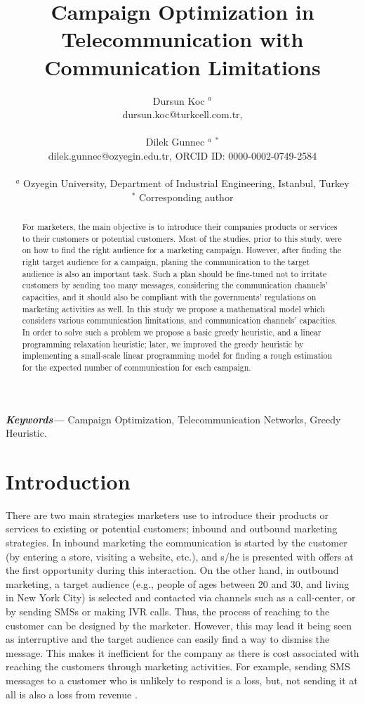 \documentclass[11pt]{article}
\title{Campaign Optimization in Telecommunication with Communication Limitations\\}
\author{Dursun Koc $^{a}$ \\ 
	dursun.koc@turkcell.com.tr, \\\\
	Dilek Gunnec $^{a}$ $^{\ast}$\\ 
	dilek.gunnec@ozyegin.edu.tr, ORCID ID: 0000-0002-0749-2584 \\\\
$^{a}$ Ozyegin University, Department of Industrial Engineering, Istanbul, Turkey \\ 
$^{\ast}$ Corresponding author \\ }
\date{}
\providecommand{\keywords}[1]
{
  \small	
  \textbf{\textit{Keywords---}} #1
}
\begin{document}
\maketitle
\begin{abstract}
For marketers, the main objective is to introduce their companies products or services to their customers or potential customers. Most of the studies, prior to this study, were on how to find the right audience for a marketing campaign. However, after finding the right target audience for a campaign, planing the communication to the target audience is also an important task. Such a plan should be fine-tuned not to irritate customers by sending too many messages, considering the communication channels' capacities, and it should also be compliant with the governments' regulations on marketing activities as well. In this study we propose a mathematical model which considers various communication limitations, and communication channels' capacities. In order to solve such a problem we propose a basic greedy heuristic, and a linear programming relaxation heuristic; later, we improved the greedy heuristic by implementing a small-scale linear programming model for finding a rough estimation for the expected number of communication for each campaign.\end{abstract}\hspace{10pt}

\keywords{Campaign Optimization, Telecommunication Networks, Greedy Heuristic.}

\newpage

\section{Introduction}

There are two main strategies marketers use to introduce their products or services to existing or potential customers; inbound and outbound marketing strategies. In inbound marketing the communication is started by the customer (by entering a store, visiting a website, etc.), and s/he is presented with offers at the first opportunity during this interaction. On the other hand, in outbound marketing, a target audience (e.g., people of ages between 20 and 30, and living in New York City) is selected and contacted via channels such as a call-center, or by sending SMSs or making IVR calls. Thus, the process of reaching to the customer can be designed by the marketer. However, this may lead it being seen as interruptive and the target audience can easily find a way to dismiss the message. This makes it inefficient for the company as there is cost associated with reaching the customers through marketing activities. For example, sending SMS messages to a customer who is unlikely to respond is a loss, but, not sending it at all is also a loss from revenue \citep{sarkar}.  
\end{document}
